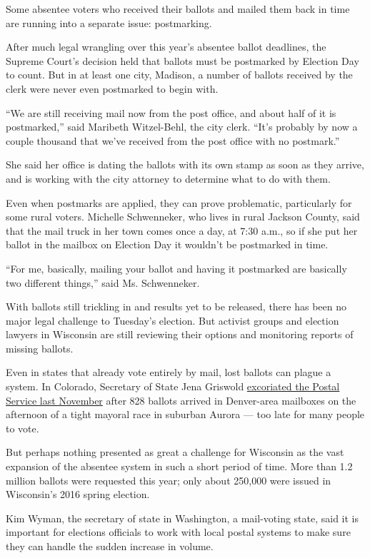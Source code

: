 Some absentee voters who received their ballots and mailed them back in
time are running into a separate issue: postmarking.

After much legal wrangling over this year's absentee ballot deadlines,
the Supreme Court's decision held that ballots must be postmarked by
Election Day to count. But in at least one city, Madison, a number of
ballots received by the clerk were never even postmarked to begin with.

``We are still receiving mail now from the post office, and about half
of it is postmarked,'' said Maribeth Witzel-Behl, the city clerk. ``It's
probably by now a couple thousand that we've received from the post
office with no postmark.''

She said her office is dating the ballots with its own stamp as soon as
they arrive, and is working with the city attorney to determine what to
do with them.

Even when postmarks are applied, they can prove problematic,
particularly for some rural voters. Michelle Schwenneker, who lives in
rural Jackson County, said that the mail truck in her town comes once a
day, at 7:30 a.m., so if she put her ballot in the mailbox on Election
Day it wouldn't be postmarked in time.

``For me, basically, mailing your ballot and having it postmarked are
basically two different things,'' said Ms. Schwenneker.

With ballots still trickling in and results yet to be released, there
has been no major legal challenge to Tuesday's election. But activist
groups and election lawyers in Wisconsin are still reviewing their
options and monitoring reports of missing ballots.

Even in states that already vote entirely by mail, lost ballots can
plague a system. In Colorado, Secretary of State Jena Griswold
\href{https://www.denverpost.com/2019/11/08/election-2019-jena-griswold/}{excoriated
the Postal Service last November} after 828 ballots arrived in
Denver-area mailboxes on the afternoon of a tight mayoral race in
suburban Aurora --- too late for many people to vote.

But perhaps nothing presented as great a challenge for Wisconsin as the
vast expansion of the absentee system in such a short period of time.
More than 1.2 million ballots were requested this year; only about
250,000 were issued in Wisconsin's 2016 spring election.

Kim Wyman, the secretary of state in Washington, a mail-voting state,
said it is important for elections officials to work with local postal
systems to make sure they can handle the sudden increase in volume.

